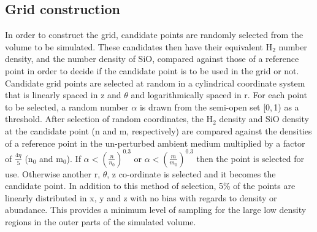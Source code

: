 \documentclass[useAMS,usenatbib,letters]{mn2e}
\begin{document}
\subsection{Grid construction} \label{subsec:gridding}
In order to construct the grid, candidate points are randomly selected from the volume to be simulated. These candidates then have their equivalent H$_2$ number density, and the number density of SiO, compared against those of a reference point in order to decide if the candidate point is to be used in the grid or not. Candidate grid points are selected at random in a cylindrical coordinate system that is linearly spaced in z and $\theta$ and logarithmically spaced in r. For each point to be selected, a random number $\alpha$ is drawn from the semi-open set [0,$\,$1) as a threshold. After selection of random coordinates, the H$_2$ density and SiO density at the candidate point (n and m, respectively) are compared against the densities of a reference point in the un-perturbed ambient medium multiplied by a factor of $\frac{4\eta}{5}$ (n$_0$ and m$_0$). If $\alpha<\left( \frac{n}{n_0} \right)^{0.3}$ or $\alpha< \left( \frac{m}{m_0} \right)^{0.3}$ then the point is selected for use. Otherwise another r, $\theta$, z co-ordinate is selected and it becomes the candidate point. In addition to this method of selection, 5\% of the points are linearly distributed in x, y and z with no bias with regards to density or abundance. This provides a minimum level of sampling for the large low density regions in the outer parts of the simulated volume. %
\end{document}
